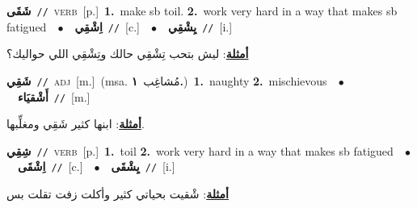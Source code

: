 \documentclass[10pt,a4paper,twoside]{article} %
\begin{document}
\begin{multicols}{2}
{\setlength\topsep{0pt}\textbf{\foreignlanguage{arabic}{شَقَى}}\ {\color{gray}\texttt{//}\color{black}}\ \textsc{verb}\ [p.]\ \textbf{1.}~make sb toil.  \textbf{2.}~work very hard in a way that makes sb fatigued\ \ $\bullet$\ \ \setlength\topsep{0pt}\textbf{\foreignlanguage{arabic}{اِشْقِي}}\ {\color{gray}\texttt{//}\color{black}}\ [c.]\ \ $\bullet$\ \ \setlength\topsep{0pt}\textbf{\foreignlanguage{arabic}{يِشْقِي}}\ {\color{gray}\texttt{//}\color{black}}\ [i.]\  \begin{flushright}\color{gray}\foreignlanguage{arabic}{\textbf{\underline{\foreignlanguage{arabic}{أمثلة}}}: ليش بتحب تِشْقِي حالك وتِشْقِي اللي حواليك؟}\end{flushright}\color{black}} \vspace{2mm}

{\setlength\topsep{0pt}\textbf{\foreignlanguage{arabic}{شَقِي}}\ {\color{gray}\texttt{//}\color{black}}\ \textsc{adj}\ [m.]\ \color{gray}(msa. \foreignlanguage{arabic}{مُشاغِب}~\foreignlanguage{arabic}{\textbf{١.}})\color{black}\ \textbf{1.}~naughty  \textbf{2.}~mischievous\ \ $\bullet$\ \ \setlength\topsep{0pt}\textbf{\foreignlanguage{arabic}{أَشْقيَاء}}\ {\color{gray}\texttt{//}\color{black}}\ [m.]\  \begin{flushright}\color{gray}\foreignlanguage{arabic}{\textbf{\underline{\foreignlanguage{arabic}{أمثلة}}}: ابنها كثير شَقِي ومغلِّبها.}\end{flushright}\color{black}} \vspace{2mm}

{\setlength\topsep{0pt}\textbf{\foreignlanguage{arabic}{شِقِي}}\ {\color{gray}\texttt{//}\color{black}}\ \textsc{verb}\ [p.]\ \textbf{1.}~toil  \textbf{2.}~work very hard in a way that makes sb fatigued\ \ $\bullet$\ \ \setlength\topsep{0pt}\textbf{\foreignlanguage{arabic}{اِشْقَى}}\ {\color{gray}\texttt{//}\color{black}}\ [c.]\ \ $\bullet$\ \ \setlength\topsep{0pt}\textbf{\foreignlanguage{arabic}{يِشْقَى}}\ {\color{gray}\texttt{//}\color{black}}\ [i.]\  \begin{flushright}\color{gray}\foreignlanguage{arabic}{\textbf{\underline{\foreignlanguage{arabic}{أمثلة}}}: شْقيت بحياتي كثير وأكلت زفت تقلت بس}\end{flushright}\color{black}} \vspace{2mm}


\end{multicols}
\end{document}
